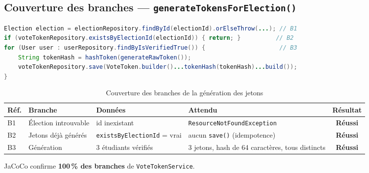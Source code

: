 \documentclass[12pt,a4paper]{report}
\newcommand{\ok}{\textcolor{okgreen}{\textbf{Réussi}}}
\begin{document}
\subsection{Couverture des branches --- \texttt{generateTokensForElection()}}
\begin{lstlisting}[language=Java]
Election election = electionRepository.findById(electionId).orElseThrow(...); // B1
if (voteTokenRepository.existsByElectionId(electionId)) { return; }          // B2
for (User user : userRepository.findByIsVerifiedTrue()) {                     // B3
    String tokenHash = hashToken(generateRawToken());
    voteTokenRepository.save(VoteToken.builder()...tokenHash(tokenHash)...build());
}
\end{lstlisting}
\begin{table}[H]
\centering
\caption{Couverture des branches de la génération des jetons}
\small
\begin{tabularx}{\textwidth}{@{}lp{3.2cm}p{3.4cm}Xc@{}}
\toprule
\rowcolor{evlight}\textbf{Réf.} & \textbf{Branche} & \textbf{Données} & \textbf{Attendu} & \textbf{Résultat}\\
\midrule
B1 & Élection introuvable & id inexistant & \texttt{ResourceNotFoundException} & \ok\\
B2 & Jetons déjà générés & \texttt{existsByElectionId} = vrai & aucun \texttt{save()} (idempotence) & \ok\\
B3 & Génération & 3 étudiants vérifiés & 3 jetons, hash de 64 caractères, tous distincts & \ok\\
\bottomrule
\end{tabularx}
\end{table}
JaCoCo confirme \textbf{100\,\% des branches} de \texttt{VoteTokenService}.
\end{document}
